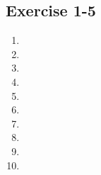 \subsection{Exercise 1-5} %

\begin{multicols}{2}
\begin{enumerate}[label=\textbf{\arabic*}., itemsep=5pt]
\item %
\item %
\item %
\item %
\item %
\item %
\item %
\item %
\item %
\item %
\end{enumerate}
\end{multicols}

